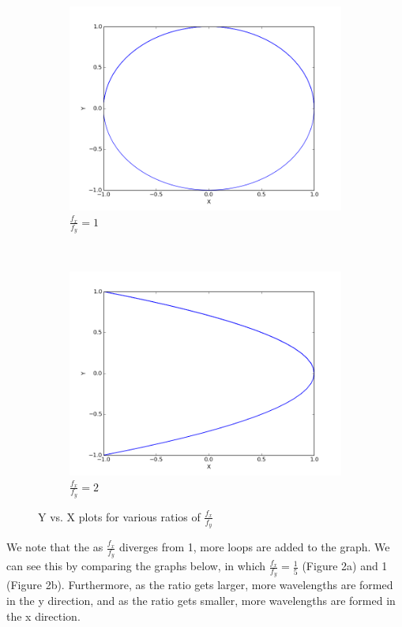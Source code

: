 \documentclass{article}
\begin{document}
\begin{enumerate}
\begin{figure}[h]
		\begin{subfigure}{0.4\textwidth}
		\centering
		\includegraphics[width=0.9\linewidth]{fig3.png}
		\caption{$\frac{f_x}{f_y} = 1$}
		\end{subfigure}
		~
		\begin{subfigure}{0.4\textwidth}
		\centering
		\includegraphics[width=0.9\linewidth]{fig4.png}
		\caption{$\frac{f_x}{f_y} = 2$}
		\end{subfigure}
		
		\caption{Y vs. X plots for various ratios of $\frac{f_x}{f_y}$}
		
	\end{figure}
	
	We note that the as $\frac{f_x}{f_y}$ diverges from 1, more loops are added to the graph. We can see this by comparing the graphs below, in which $\frac{f_x}{f_y} = \frac{1}{5}$ (Figure 2a) and 1 (Figure 2b). Furthermore, as the ratio gets larger, more wavelengths are formed in the y direction, and as the ratio gets smaller, more wavelengths are formed in the x direction.
	

\end{enumerate}
\end{document}
